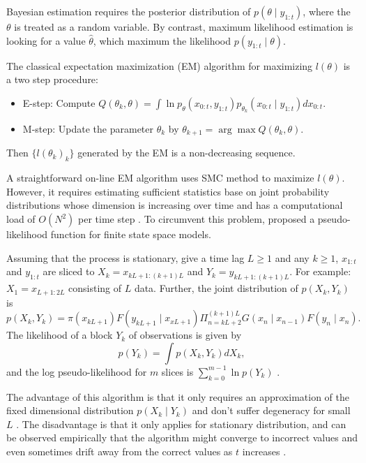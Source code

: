 Bayesian estimation requires the posterior distribution of $p(\theta\mid y_{1:t})$, where the $\theta$ is treated as a random variable. By contrast, maximum likelihood estimation is looking for a value $\hat{\theta}$, which maximum the likelihood $p(y_{1:t}\mid \theta)$. 

The classical expectation maximization (EM) algorithm \cite{dempster1977maximum} for maximizing $l(\theta)$ is a two step procedure: 
\begin{itemize}
\item{E-step}:   Compute  $Q(\theta_k,\theta)=\int \ln p_\theta(x_{0:t},y_{1:t})p_{\theta_k}(x_{0:t}\mid y_{1:t}) dx_{0:t}$. 
\item{M-step}: Update the parameter $\theta_k$ by $\theta_{k+1}=\arg \max Q(\theta_k,\theta)$.
\end{itemize}
Then $\{l(\theta_k)_k\}$ generated by the EM is a non-decreasing sequence.  

A straightforward on-line EM algorithm uses SMC method to maximize $l(\theta)$. However, it requires estimating sufficient statistics base on joint probability distributions whose dimension is increasing over time and has a computational load of $\mathit{O}(N^2)$ per time step \cite{kantas2009overview}.  To circumvent this problem, \cite{andrieu2005line} proposed a pseudo-likelihood function for finite state space models. 

Assuming that the process is stationary, give a time lag $L\geq 1$ and any $k\geq 1$, $x_{1:t}$ and $y_{1:t}$ are sliced to $X_k= x_{kL+1:(k+1)L}$ and $Y_k=  y_{kL+1:(k+1)L}$. For example: $X_1= x_{L+1:2L}$ consisting of $L$ data. Further, the joint distribution of $p(X_k,Y_k)$ is 
\begin{equation}
p(X_k,Y_k) = \pi(x_{kL+1})F(y_{kL+1}\mid x_{xL+1})\Pi_{n=kL+2}^{(k+1)L}G(x_n\mid x_{n-1})F(y_n\mid x_n). 
\end{equation}
The likelihood of a block $Y_k$ of observations is given by 
\begin{equation}
p(Y_k) = \int p(X_k,Y_k)dX_k,
\end{equation}
and the log pseudo-likelihood for $m$ slices is $\sum_{k=0}^{m-1}\ln p(Y_k)$  \cite{andrieu2005line}.


The advantage of this algorithm is that it only requires an approximation of the fixed dimensional distribution $p(X_k\mid Y_k)$ and don't suffer degeneracy for small $L$ \cite{kantas2009overview}. The disadvantage is that it only applies for stationary distribution, and can be observed empirically that the algorithm might converge to incorrect values and even sometimes drift away from the correct values as $t$ increases \cite{andrieu2010particle}.  





